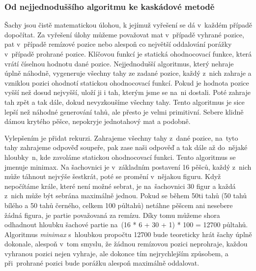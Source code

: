 \documentclass[11pt, titlepage]{article}
\begin{document}
\subsubsection{Od nejjednoduššího algoritmu ke kaskádové metodě}
Šachy jsou čistě matematickou úlohou, k jejímuž vyřešení se dá v~každém případě dopočítat. Za vyřešení úlohy můžeme považovat mat v~případě vyhrané pozice, pat v~případě remízové pozice nebo alespoň co největší oddalování porážky v~případě prohrané pozice. Klíčovou funkcí je statická ohodnocovací funkce, která vrátí číselnou hodnotu dané pozice. Nejjednodušší algoritmus, který nehraje úplně náhodně, vygeneruje všechny tahy ze zadané pozice, každý z~nich zahraje a vzniklou pozici ohodnotí statickou ohodnocovací funkcí. Pokud je hodnota pozice vyšší než dosud nejvyšší, uloží ji i tah, kterým jsme se na~ni dostali. Poté zahraje tah zpět a tak dále, dokud nevyzkoušíme všechny tahy. Tento algoritmus je sice lepší než náhodné generování tahů, ale přesto je velmi primitivní. Sebere klidně dámou krytého pěšce, nepokryje jednotahový mat a podobně.

Vylepšením je přidat rekurzi. Zahrajeme všechny tahy z~dané pozice, na~tyto tahy zahrajeme odpověď soupeře, pak zase naši odpověď a tak dále až do~nějaké hloubky~n, kde zavoláme statickou ohodnocovací funkci. Tento algoritmus se jmenuje minimax. Na šachovnici je v~základním postavení 16 pěšců, každý z~nich může táhnout nejvýše šestkrát, poté se promění v~nějakou figuru. Když nepočítáme krále, které není možné sebrat, je na~šachovnici 30 figur a každá z~nich může být sebrána maximálně jednou. Pokud se během 50ti tahů (50 tahů bílého a 50 tahů černého, celkem 100 půltahů) netáhne pěšcem ani nesebere žádná figura, je partie považovaná za remízu. Díky tomu můžeme shora odhadnout hloubku šachové partie na~(16 * 6 + 30 + 1) * 100 = 12700 půltahů. Algoritmus {\it minimax} s~hloubkou propočtu 12700 bude teoreticky hrát šachy úplně dokonale, alespoň v~tom smyslu, že žádnou remízovou pozici neprohraje, každou vyhranou pozici nejen vyhraje, ale dokonce tím nejrychlejším způsobem, a při~prohrané pozici bude porážku alespoň maximálně oddalovat.
\end{document}
